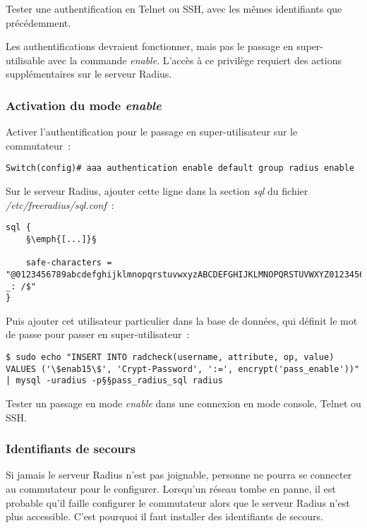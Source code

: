 Tester une authentification en Telnet ou SSH, avec les mêmes identifiants que précédemment.

Les authentifications devraient fonctionner, mais pas le passage en super-utilisable avec la commande \emph{enable}. L'accès à ce privilège requiert des actions supplémentaires sur le serveur Radius.

\subsubsection{Activation du mode \emph{enable}}

Activer l'authentification pour le passage en super-utilisateur sur le commutateur~:

\begin{lstlisting}[morekeywords=0]
Switch(config)# aaa authentication enable default group radius enable
\end{lstlisting}

Sur le serveur Radius, ajouter cette ligne dans la section \emph{sql} du fichier \emph{/etc/freeradius/sql.conf}~:

\begin{lstlisting}
sql {
	§\emph{[...]}§

	safe-characters = "@0123456789abcdefghijklmnopqrstuvwxyzABCDEFGHIJKLMNOPQRSTUVWXYZ0123456789.-_: /$"
}
\end{lstlisting}

Puis ajouter cet utilisateur particulier dans la base de données, qui définit le mot de passe pour passer en super-utilisateur~:

\begin{lstlisting}
$ sudo echo "INSERT INTO radcheck(username, attribute, op, value) VALUES ('\$enab15\$', 'Crypt-Password', ':=', encrypt('pass_enable'))" | mysql -uradius -p§§pass_radius_sql radius
\end{lstlisting}

Tester un passage en mode \emph{enable} dans une connexion en mode console, Telnet ou SSH.

\subsubsection{Identifiants de secours}

Si jamais le serveur Radius n'est pas joignable, personne ne pourra se connecter au commutateur pour le configurer. Lorsqu'un réseau tombe en panne, il est probable qu'il faille configurer le commutateur alors que le serveur Radius n'est plus accessible. C'est pourquoi il faut installer des identifiants de secours.

